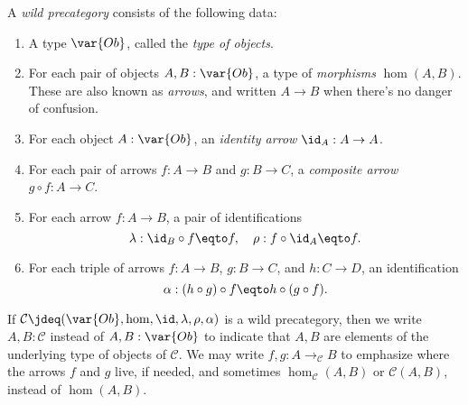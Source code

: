 \begin{definition}\label{def:wild-cat}
  A \emph{wild precategory}
  consists of the following data:
  \begin{enumerate}
  \item\label{struc:cat-ob} A type $\var{Ob}$, called the \emph{type of objects}.
  \item\label{struc:cat-mor} For each pair of objects $A,B : \var{Ob}$,
    a type of \emph{morphisms} $\hom(A,B)$. These are also known as \emph{arrows},
    and written $A \to B$ when there's no danger of confusion.
  \item\label{struc:cat-id} For each object $A : \var{Ob}$,
    an \emph{identity arrow} $\id_A : A \to A$.
  \item\label{struc:cat-comp} For each pair of arrows $f : A \to B$ and $g : B \to C$,
    a \emph{composite arrow} $g\circ f : A \to C$.
  \item\label{struc:cat-unit-laws} For each arrow $f : A \to B$,
    a pair of identifications
    \[
      \lambda : \id_B \circ f \eqto f, \quad
      \rho : f \circ \id_A \eqto f.
    \]
  \item\label{struct:cat-assoc} For each triple of arrows
    $f : A \to B$, $g : B \to C$, and $h : C \to D$, an identification
    \[
      \alpha : (h \circ g) \circ f \eqto h \circ (g \circ f).
    \]
  \end{enumerate}
  If $\mathcal C \jdeq (\var{Ob},\hom,\id,\lambda,\rho,\alpha)$
  is a wild precategory, then we write $A, B : \mathcal C$ instead of $A, B : \var{Ob}$
  to indicate that $A, B$ are elements of the underlying type of objects of $\mathcal C$.
  We may write $f, g : A \to_{\mathcal C} B$ to emphasize where the arrows $f$ and $g$ live, if needed,
  and sometimes $\hom_{\mathcal C}(A,B)$ or $\mathcal C(A,B)$, instead of $\hom(A,B)$.
\end{definition}
